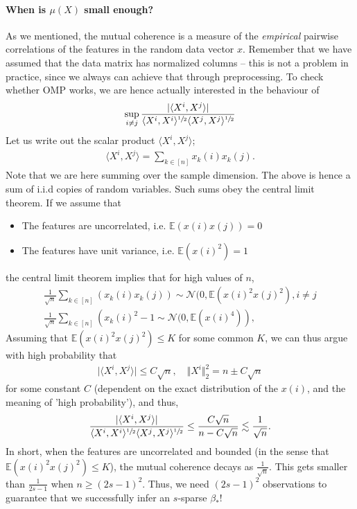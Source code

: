\documentclass{article}
\newcommand{\sprod}[1]{\langle #1 \rangle}
\newcommand{\abs}[1]{\vert #1 \vert}
\newcommand{\norm}[1]{\Vert #1 \Vert}
\newcommand{\leqsim}{\lesssim}
\begin{document}
\paragraph{When is $\mu(X)$ small enough?} As we mentioned, the mutual coherence is a measure of the \emph{empirical} pairwise correlations of the features in the random data vector $x$. Remember that we have assumed that the data matrix has normalized columns --  this is not a problem in practice, since we always can achieve that through preprocessing. To check whether OMP works, we are hence actually interested in the behaviour of
\begin{align*}
    \sup_{i \neq j}  \frac{\abs{\sprod{X^i,X^j}}}{\sprod{X^i,X^i}^{\sfrac{1}{2}}\sprod{X^j,X^j}^{\sfrac{1}{2}}}
\end{align*}
Let us write out the scalar product $\sprod{X^i,X^j}$;
\begin{align*}
    \sprod{X^i,X^j} = \sum_{k \in [n]} x_k(i)x_k(j).
\end{align*}
Note that we are here summing over the sample dimension. The above is hence a sum of i.i.d copies of random variables.
Such sums obey the central limit theorem. If we assume that 
\begin{itemize}
    \item The features are uncorrelated, i.e. $\mathbb{E}(x(i)x(j))=0$
    \item The features have unit variance, i.e. $\mathbb{E}(x(i)^2)=1$
\end{itemize}
the central limit theorem implies that for high values of $n$,
\begin{align*}
    \frac{1}{\sqrt{n}} \sum_{k \in [n]}\left(x_k(i)x_k(j)\right) \sim \mathcal{N}(0,\mathbb{E}(x(i)^2x(j)^2), i \neq j \\
    \frac{1}{\sqrt{n}} \sum_{k \in [n]}\left(x_k(i)^2- 1 \sim \mathcal{N}(0,\mathbb{E}(x(i)^4)\right),
\end{align*}
Assuming that $\mathbb{E}(x(i)^2x(j)^2)\leq K$ for some common $K$, we can thus argue with high probability that
\begin{align}
    \abs{\sprod{X^i,X^j}} \leq C \sqrt{n}, \quad \norm{X^i}_2^2 = n \pm C\sqrt{n}
\end{align}
for some constant $C$ (dependent on the exact distribution of the $x(i)$, and the meaning of 'high probability'), and thus,
\begin{align*}
     \frac{\abs{\sprod{X^i,X^j}}}{\sprod{X^i,X^i}^{\sfrac{1}{2}}\sprod{X^j,X^j}^{\sfrac{1}{2}}} \leq \frac{C\sqrt{n}}{n - C\sqrt{n}} \leqsim \frac{1}{\sqrt{n}}.
\end{align*}
In short, when the features are uncorrelated and bounded (in the sense that $\mathbb{E}(x(i)^2x(j)^2)\leq K$), the mutual coherence decays as $\frac{1}{\sqrt{n}}$. This gets smaller than $\frac{1}{2s-1}$ when $n\geq (2s-1)^2$. Thus, we need $(2s-1)^2$ observations to guarantee that we successfully infer an $s$-sparse $\beta_*$! 
\end{document}
